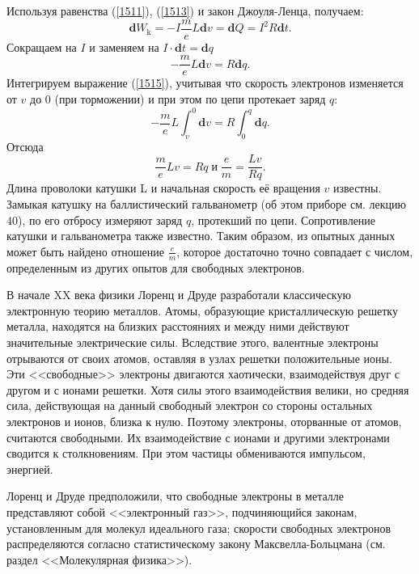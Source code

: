 \documentclass[a4paper,10pt]{book}
\begin{document}
Используя равенства (\ref{1511}), (\ref{1513}) и закон Джоуля-Ленца, получаем:
\begin{equation}\label{1514}
 \mathbf{d}W_\text{k} = -I\frac{m}{e}L\mathbf{d}v = \mathbf{d}Q = I^2R\mathbf{d}t.
\end{equation}
Сокращаем на $I$ и заменяем на $I\cdot \mathbf{d}t = \mathbf{d}q$
\begin{equation}\label{1515}
 -\frac{m}{e}L\mathbf{d}v = R\mathbf{d}q.
\end{equation}
Интегрируем выражение (\ref{1515}), учитывая что скорость электронов изменяется от $v$ до $0$ (при торможении) и при этом по цепи протекает заряд
$q$:
\begin{equation*}
 -\frac{m}{e}L\int_v^0\mathbf{d}v = R\int_0^q\mathbf{d}q.
\end{equation*}
Отсюда
\begin{equation}\label{1516}
 \frac{m}{e}Lv = Rq \;\text{и}\;\frac{e}{m}=\frac{Lv}{Rq}.
\end{equation}
Длина проволоки катушки L и начальная скорость её вращения $v$ известны. Замыкая катушку на баллистический гальванометр (об этом приборе см. лекцию 40),
по его отбросу измеряют заряд $q$, протекший по цепи. Сопротивление катушки и гальванометра также известно. Таким образом, из опытных данных
может быть найдено отношение $\frac{e}{m}$, которое достаточно точно совпадает с числом, определенным из других опытов для свободных электронов.

В начале XX века физики Лоренц и Друде разработали классическую электронную теорию металлов. Атомы, образующие кристаллическую решетку металла, 
находятся на близких расстояниях и между ними действуют значительные электрические силы. Вследствие этого, валентные электроны отрываются от своих
атомов, оставляя в узлах решетки положительные ионы. Эти <<свободные>> электроны двигаются хаотически, взаимодействуя друг с другом и с ионами
решетки. Хотя силы этого взаимодействия велики, но средняя сила, действующая на данный свободный электрон со стороны остальных электронов и 
ионов, близка к нулю. Поэтому электроны, оторванные от атомов, считаются свободными. Их взаимодействие с ионами и другими электронами сводится к столкновениям.
При этом частицы обмениваются импульсом, энергией.

Лоренц и Друде предположили, что свободные электроны в металле представляют собой <<электронный газ>>, подчиняющийся законам, установленным
для молекул идеального газа; скорости свободных электронов распределяются согласно статистическому закону Максвелла-Больцмана (см. раздел 
<<Молекулярная физика>>).
\end{document}
